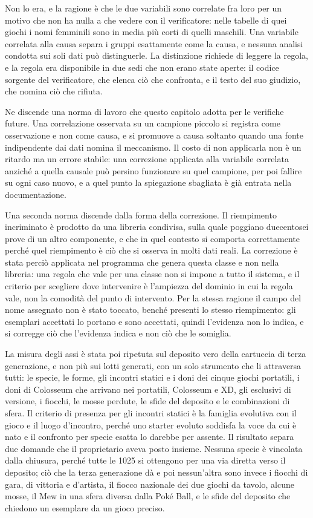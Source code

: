 Non lo era, e la ragione è che le due variabili sono correlate fra loro per un motivo che non ha nulla a che vedere con il verificatore: nelle tabelle di quei giochi i nomi femminili sono in media più corti di quelli maschili. Una variabile correlata alla causa separa i gruppi esattamente come la causa, e nessuna analisi condotta sui soli dati può distinguerle. La distinzione richiede di leggere la regola, e la regola era disponibile in due sedi che non erano state aperte: il codice sorgente del verificatore, che elenca ciò che confronta, e il testo del suo giudizio, che nomina ciò che rifiuta.

Ne discende una norma di lavoro che questo capitolo adotta per le verifiche future. Una correlazione osservata su un campione piccolo si registra come osservazione e non come causa, e si promuove a causa soltanto quando una fonte indipendente dai dati nomina il meccanismo. Il costo di non applicarla non è un ritardo ma un errore stabile: una correzione applicata alla variabile correlata anziché a quella causale può persino funzionare su quel campione, per poi fallire su ogni caso nuovo, e a quel punto la spiegazione sbagliata è già entrata nella documentazione.

Una seconda norma discende dalla forma della correzione. Il riempimento incriminato è prodotto da una libreria condivisa, sulla quale poggiano duecentosei prove di un altro componente, e che in quel contesto si comporta correttamente perché quel riempimento è ciò che si osserva in molti dati reali. La correzione è stata perciò applicata nel programma che genera questa classe e non nella libreria: una regola che vale per una classe non si impone a tutto il sistema, e il criterio per scegliere dove intervenire è l'ampiezza del dominio in cui la regola vale, non la comodità del punto di intervento. Per la stessa ragione il campo del nome assegnato non è stato toccato, benché presenti lo stesso riempimento: gli esemplari accettati lo portano e sono accettati, quindi l'evidenza non lo indica, e si corregge ciò che l'evidenza indica e non ciò che le somiglia.

La misura degli assi è stata poi ripetuta sul deposito vero della cartuccia di terza generazione, e non più sui lotti generati, con un solo strumento che li attraversa tutti: le specie, le forme, gli incontri statici e i doni dei cinque giochi portatili, i doni di Colosseum che arrivano nei portatili, Colosseum e XD, gli esclusivi di versione, i fiocchi, le mosse perdute, le sfide del deposito e le combinazioni di sfera. Il criterio di presenza per gli incontri statici è la famiglia evolutiva con il gioco e il luogo d'incontro, perché uno starter evoluto soddisfa la voce da cui è nato e il confronto per specie esatta lo darebbe per assente. Il risultato separa due domande che il proprietario aveva posto insieme. Nessuna specie è vincolata dalla chiusura, perché tutte le 1025 si ottengono per una via diretta verso il deposito; ciò che la terza generazione dà e poi nessun'altra sono invece i fiocchi di gara, di vittoria e d'artista, il fiocco nazionale dei due giochi da tavolo, alcune mosse, il Mew in una sfera diversa dalla Poké Ball, e le sfide del deposito che chiedono un esemplare da un gioco preciso.

